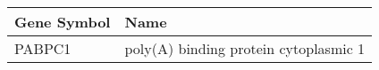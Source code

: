 \begin{tabular}{ll}
\toprule
Gene Symbol &                                  Name \\
\midrule
     PABPC1 & poly(A) binding protein cytoplasmic 1 \\
\bottomrule
\end{tabular}
